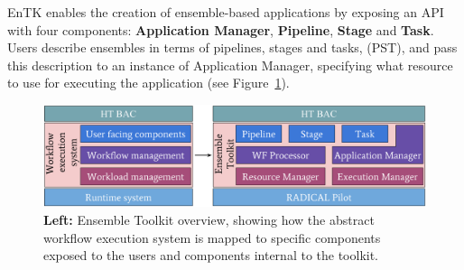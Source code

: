 

EnTK enables the creation of ensemble-based applications by 
exposing an API with four components: %
\textbf{Application Manager}, \textbf{Pipeline}, \textbf{Stage} and
\textbf{Task}. %
Users describe ensembles in terms of pipelines, stages and tasks, (PST), and pass this description to an instance of 
Application Manager, %
specifying what resource to use for executing the application (see
Figure~\ref{fig:entk_arch}).


\begin{figure}
  \centering
  \includegraphics[width=\columnwidth]{FIGURES/entk_overview.pdf}
  \caption{\textbf{Left:} Ensemble Toolkit overview, showing how the abstract
           workflow execution system is mapped to specific components exposed
           to the users and components internal to the
           toolkit.}\label{fig:entk_arch}
\end{figure}

